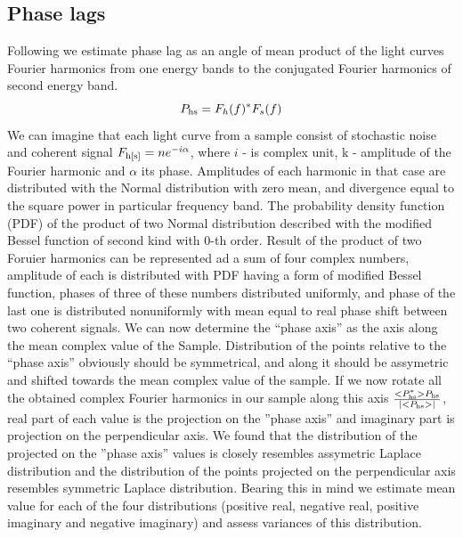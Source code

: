 \documentclass[a4paper,fleqn,usenatbib]{mnras}
\begin{document}
\begin{table}

\subsection{Phase lags}
    
Following \citep{1997ApJ...474L..43V} we estimate phase lag as an angle of mean product of the light curves Fourier harmonics from one energy bands to the conjugated Fourier harmonics of second energy band. 
\begin{equation}
        P_{\rm hs} = F_h(f)^{*}F_s(f)
\end{equation}
We can imagine that each light curve from a sample consist of stochastic noise and coherent signal $F_{\rm h[s]} = ne^{-i\alpha}$, where $i$ - is complex unit, k - amplitude of the Fourier harmonic and $\alpha$ its phase.
Amplitudes of each harmonic in that case are distributed with the Normal distribution with zero mean, and divergence equal to the square power in particular frequency band. 
The probability density function (PDF) of the product of two Normal distribution described with the modified Bessel function of second kind with 0-th order. 
Result of the product of two Foruier harmonics can be represented ad a sum of four complex numbers, amplitude of each is distributed with PDF having a form of modified Bessel function, phases of three of these numbers distributed uniformly, and phase of the last one is distributed nonuniformly with mean equal to real phase shift between two coherent signals.
We can now determine the ``phase axis'' as the axis along the mean complex value of the Sample.
Distribution of the points relative to the ``phase axis'' obviously should be symmetrical, and along it should be assymetric and shifted towards the mean complex value of the sample.
If we now rotate all the obtained complex Fourier harmonics in our sample along this axis $\frac{<P_{\rm hs}^{*}>P_{\rm hs}}{|<P_{\rm hs}>|}$, real part of each value is the projection on the ''phase axis'' and imaginary part is projection on the perpendicular axis. 
We found that the distribution of the projected on the ''phase axis'' values is closely resembles assymetric Laplace distribution and the distribution of the points projected on the perpendicular axis resembles symmetric Laplace distribution. 
Bearing this in mind we estimate mean value for each of the four distributions (positive real, negative real, positive imaginary and negative imaginary) and assess variances of this distribution.

\end{table}
\end{document}
